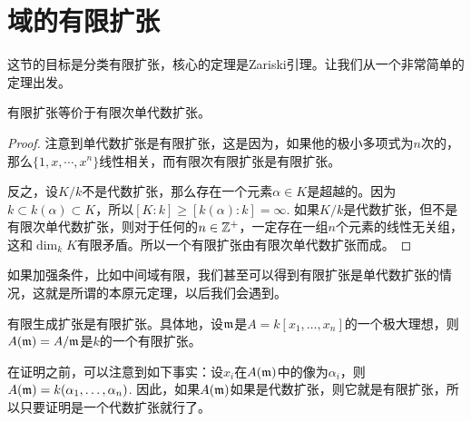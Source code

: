 \section{域的有限扩张}

这节的目标是分类有限扩张，核心的定理是Zariski引理。让我们从一个非常简单的定理出发。

\begin{pro}
有限扩张等价于有限次单代数扩张。
\end{pro}

\begin{proof} 注意到单代数扩张是有限扩张，这是因为，如果他的极小多项式为$n$次的，那么$\{1,x,\cdots,x^n\}$线性相关，而有限次有限扩张是有限扩张。

反之，设$K/k$不是代数扩张，那么存在一个元素$\alpha\in K$是超越的。因为$k\subset k(\alpha)\subset K$，所以$[K:k]\geq [k(\alpha):k]=\infty$. 如果$K/k$是代数扩张，但不是有限次单代数扩张，则对于任何的$n\in \mathbb{Z}^+$，一定存在一组$n$个元素的线性无关组，这和$\dim_k K$有限矛盾。所以一个有限扩张由有限次单代数扩张而成。\end{proof}

如果加强条件，比如中间域有限，我们甚至可以得到有限扩张是单代数扩张的情况，这就是所谓的本原元定理，以后我们会遇到。

\begin{thm}[Zariski引理]
有限生成扩张是有限扩张。具体地，设$\mathfrak{m}$是$A=k[x_1,\dots,x_n]$的一个极大理想，则$A(\mathfrak{m})=A/\mathfrak{m}$是$k$的一个有限扩张。
\end{thm}

在证明之前，可以注意到如下事实：设$x_i$在$A(\mathfrak{m})$中的像为$\alpha_i$，则$A(\mathfrak{m})=k(\alpha_1,\dots,\alpha_n)$. 因此，如果$A(\mathfrak{m})$如果是代数扩张，则它就是有限扩张，所以只要证明是一个代数扩张就行了。

